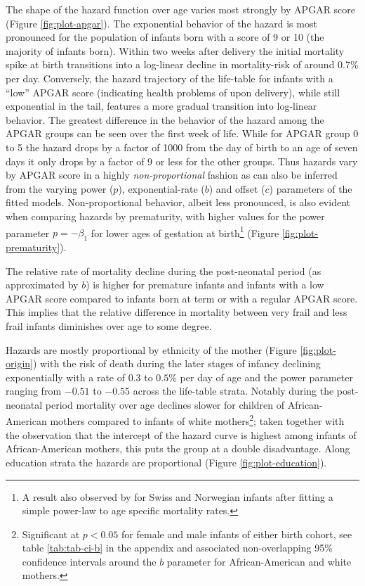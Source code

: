 \documentclass[10pt, twoside, parskip=half]{article}
\begin{document}
The shape of the hazard function over age varies most strongly by APGAR
score (Figure \ref{fig:plot-apgar}). The exponential behavior of the
hazard is most pronounced for the population of infants born with a
score of 9 or 10 (the majority of infants born). Within two weeks after
delivery the initial mortality spike at birth transitions into a
log-linear decline in mortality-risk of around 0.7\% per day.
Conversely, the hazard trajectory of the life-table for infants with a
``low'' APGAR score (indicating health problems of upon delivery), while
still exponential in the tail, features a more gradual transition into
log-linear behavior. The greatest difference in the behavior of the
hazard among the APGAR groups can be seen over the first week of life.
While for APGAR group 0 to 5 the hazard drops by a factor of 1000 from
the day of birth to an age of seven days it only drops by a factor of 9
or less for the other groups. Thus hazards vary by APGAR score in a
highly \emph{non-proportional} fashion as can also be inferred from the
varying power (\(p\)), exponential-rate (\(b\)) and offset (\(c\))
parameters of the fitted models. Non-proportional behavior, albeit less
pronounced, is also evident when comparing hazards by prematurity, with
higher values for the power parameter \(p=-\beta_1\) for lower ages of
gestation at birth\footnote{A result also observed by \citet{Berrut2016}
  for Swiss and Norwegian infants after fitting a simple power-law to
  age specific mortality rates.} (Figure \ref{fig:plot-prematurity}).

The relative rate of mortality decline during the post-neonatal period
(as approximated by \(b\)) is higher for premature infants and infants
with a low APGAR score compared to infants born at term or with a
regular APGAR score. This implies that the relative difference in
mortality between very frail and less frail infants diminishes over age
to some degree.

Hazards are mostly proportional by ethnicity of the mother (Figure
\ref{fig:plot-origin}) with the risk of death during the later stages of
infancy declining exponentially with a rate of \(0.3\) to \(0.5\%\) per
day of age and the power parameter ranging from \(-0.51\) to \(-0.55\)
across the life-table strata. Notably during the post-neonatal period
mortality over age declines slower for children of African-American
mothers compared to infants of white mothers\footnote{Significant at
  \(p<0.05\) for female and male infants of either birth cohort, see
  table \ref{tab:tab-ci-b} in the appendix and associated
  non-overlapping 95\% confidence intervals around the \(b\) parameter
  for African-American and white mothers.}; taken together with the
observation that the intercept of the hazard curve is highest among
infants of African-American mothers, this puts the group at a double
disadvantage. Along education strata the hazards are proportional
(Figure \ref{fig:plot-education}).
\end{document}
